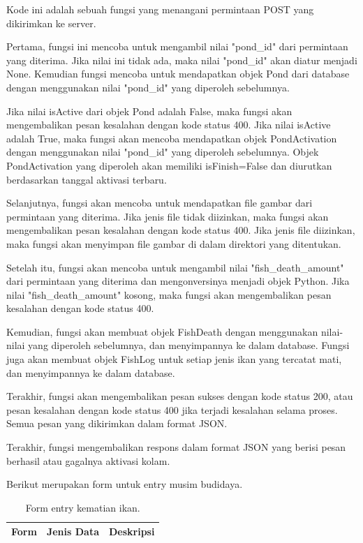 \begin{enumerate}[1.]
Kode ini adalah sebuah fungsi yang menangani permintaan POST yang dikirimkan ke server.

Pertama, fungsi ini mencoba untuk mengambil nilai "pond\_id" dari permintaan yang diterima. Jika nilai ini tidak ada, maka nilai "pond\_id" akan diatur menjadi None. Kemudian fungsi mencoba untuk mendapatkan objek Pond dari database dengan menggunakan nilai "pond\_id" yang diperoleh sebelumnya.

Jika nilai isActive dari objek Pond adalah False, maka fungsi akan mengembalikan pesan kesalahan dengan kode status 400. Jika nilai isActive adalah True, maka fungsi akan mencoba mendapatkan objek PondActivation dengan menggunakan nilai "pond\_id" yang diperoleh sebelumnya. Objek PondActivation yang diperoleh akan memiliki isFinish=False dan diurutkan berdasarkan tanggal aktivasi terbaru.

Selanjutnya, fungsi akan mencoba untuk mendapatkan file gambar dari permintaan yang diterima. Jika jenis file tidak diizinkan, maka fungsi akan mengembalikan pesan kesalahan dengan kode status 400. Jika jenis file diizinkan, maka fungsi akan menyimpan file gambar di dalam direktori yang ditentukan.

Setelah itu, fungsi akan mencoba untuk mengambil nilai "fish\_death\_amount" dari permintaan yang diterima dan mengonversinya menjadi objek Python. Jika nilai "fish\_death\_amount" kosong, maka fungsi akan mengembalikan pesan kesalahan dengan kode status 400.

Kemudian, fungsi akan membuat objek FishDeath dengan menggunakan nilai-nilai yang diperoleh sebelumnya, dan menyimpannya ke dalam database. Fungsi juga akan membuat objek FishLog untuk setiap jenis ikan yang tercatat mati, dan menyimpannya ke dalam database.

Terakhir, fungsi akan mengembalikan pesan sukses dengan kode status 200, atau pesan kesalahan dengan kode status 400 jika terjadi kesalahan selama proses. Semua pesan yang dikirimkan dalam format JSON.

Terakhir, fungsi mengembalikan respons dalam format JSON yang berisi pesan berhasil atau gagalnya aktivasi kolam.

Berikut merupakan form untuk entry musim budidaya.

\begin{longtable}{| l | p{5cm} | p{5cm} |}
\caption{Form entry kematian ikan.\label{table:form_entry_kematian_ikan}}\\

\hline
\multicolumn{1}{|c|}{\textbf{Form}} & \multicolumn{1}{|c|}{\textbf{Jenis Data}} & \multicolumn{1}{|c|}{\textbf{Deskripsi}}\\
\hline
\endfirsthead


\end{longtable}
\end{enumerate}
